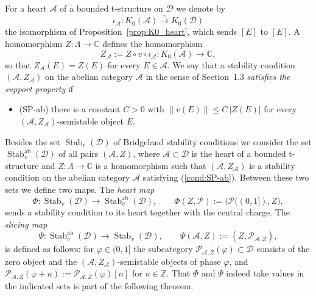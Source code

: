 \documentclass[12pt]{amsart}
\makeatletter
\newcommand{\condlabel}[2]{\phantomsection\def\@currentlabel{#1}\label{#2}\textup{(#1)}}
\newcommand{\condref}[1]{\textup{(\ref{#1})}}
\numberwithin{theorem}{section}
\theoremstyle{definition}
\newcommand{\CC}{\mathbb{C}}
\newcommand{\ZZ}{\mathbb{Z}}
\newcommand{\calA}{\mathcal{A}}
\newcommand{\calP}{\mathcal{P}}
\newcommand{\Kgroup}{K_0}
\newcommand{\calD}{\mathcal{D}}
\makeatother
\begin{document}
	For a heart $\calA$ of a bounded t-structure on $\calD$ we denote by
	\[
	\iota_{\calA} \colon \Kgroup(\calA) \xrightarrow{\ \sim\ } \Kgroup(\calD)
	\]
	the isomorphism of Proposition~\ref{prop:K0_heart}, which sends $[E]$ to $[E]$.
	A homomorphism $Z \colon \Lambda \to \CC$ defines the homomorphism
	\[
	Z_{\calA} := Z \circ v \circ \iota_{\calA} \colon \Kgroup(\calA) \longrightarrow \CC ,
	\]
	so that $Z_{\calA}(E) = Z(E)$ for every $E \in \calA$.
	We say that a stability condition $(\calA, Z_{\calA})$ on the abelian category $\calA$ in the sense of Section~1.3 \emph{satisfies the support property} if
	\begin{itemize}
		\item[] \condlabel{SP-ab}{cond:SP-ab} there is a constant $C > 0$ with $\| v(E) \| \leqslant C \, |Z(E)|$ for every $(\calA, Z_{\calA})$-semistable object $E$.
	\end{itemize}
	Besides the set $\operatorname{Stab}_v(\calD)$ of Bridgeland stability conditions we consider the set $\operatorname{Stab}^{\mathrm{ab}}_v(\calD)$ of all pairs $(\calA, Z)$, where $\calA \subset \calD$ is the heart of a bounded t-structure and $Z \colon \Lambda \to \CC$ is a homomorphism such that $(\calA, Z_{\calA})$ is a stability condition on the abelian category $\calA$ satisfying \condref{cond:SP-ab}.
	Between these two sets we define two maps.
	The \emph{heart map}
	\[
	\Phi \colon \operatorname{Stab}_v(\calD) \longrightarrow \operatorname{Stab}^{\mathrm{ab}}_v(\calD) , \qquad \Phi(Z, \calP) := \big( \calP((0, 1]), Z \big) ,
	\]
	sends a stability condition to its heart together with the central charge.
	The \emph{slicing map}
	\[
	\Psi \colon \operatorname{Stab}^{\mathrm{ab}}_v(\calD) \longrightarrow \operatorname{Stab}_v(\calD) , \qquad \Psi(\calA, Z) := (Z, \calP_{\calA, Z}) ,
	\]
	is defined as follows: for $\varphi \in (0, 1]$ the subcategory $\calP_{\calA, Z}(\varphi) \subset \calD$ consists of the zero object and the $(\calA, Z_{\calA})$-semistable objects of phase $\varphi$, and $\calP_{\calA, Z}(\varphi + n) := \calP_{\calA, Z}(\varphi)[n]$ for $n \in \ZZ$.
	That $\Phi$ and $\Psi$ indeed take values in the indicated sets is part of the following theorem.
\end{document}
